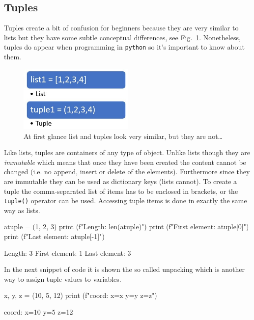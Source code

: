 \begin{ipythonnon}
\section{Tuples}\label{tuples}

Tuples create a bit of confusion for beginners because they are very similar to lists but they have some subtle conceptual differences, see Fig.~\ref{fig:tuples}. Nonetheless, tuples do appear when programming in \texttt{python} so it's important to know about them.

\begin{figure}[hb]
\centering
\includegraphics[width=0.5\textwidth]{figures/Difference-Between-List-and-Tuple-fig-1-2.jpg}
\caption{At first glance list and tuples look very similar, but they are not\ldots}
\label{fig:tuples}
\end{figure}

Like lists, tuples are containers of any type of object. Unlike lists though they are \emph{immutable} which means that once they have been created the content cannot be changed (i.e. no append, insert or delete of the elements). Furthermore since they are immutable they can be used as dictionary keys (lists cannot). To create a tuple the comma-separated list of items has to be enclosed in brackets, or the \texttt{tuple()} operator can be used. Accessing tuple items is done in exactly the same way as lists.

\begin{ipythonnon}
atuple = (1, 2, 3)
print (f"Length: {len(atuple)}")
print (f"First element: {atuple[0]}")
print (f"Last element: {atuple[-1]}")
\end{ipythonnon}
\begin{ioutput}
Length: 3
First element: 1
Last element: 3
\end{ioutput}

In the next snippet of code it is shown the so called unpacking which is another way to assign tuple values to variables.

\begin{ipythonnon}
x, y, z = (10, 5, 12)
print (f"coord: x={x} y={y} z={z}")
\end{ipythonnon}
\begin{ioutput}
coord: x=10 y=5 z=12
\end{ioutput}


\end{ipythonnon}
